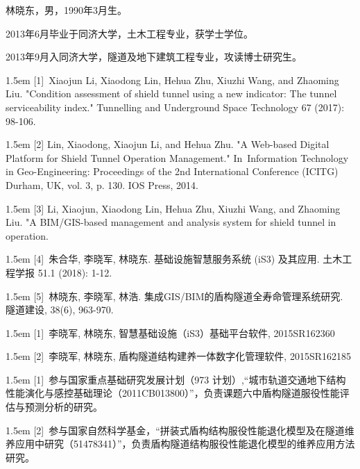 \begin{resume}

	林晓东，男，1990年3月生。

	2013年6月毕业于同济大学，土木工程专业，获学士学位。

	2013年9月入同济大学，隧道及地下建筑工程专业，攻读博士研究生。


	\hangindent 1.5em
	[1]~Xiaojun Li, Xiaodong Lin, Hehua Zhu, Xiuzhi Wang, and Zhaoming Liu. "Condition assessment of shield tunnel using a new indicator: The tunnel serviceability index." Tunnelling and Underground Space Technology 67 (2017): 98-106.

	\hangindent 1.5em
	[2] Lin, Xiaodong, Xiaojun Li, and Hehua Zhu. "A Web-based Digital Platform for Shield Tunnel Operation Management." In Information Technology in Geo-Engineering: Proceedings of the 2nd International Conference (ICITG) Durham, UK, vol. 3, p. 130. IOS Press, 2014.

	\hangindent 1.5em
	[3] Li, Xiaojun, Xiaodong Lin, Hehua Zhu, Xiuzhi Wang, and Zhaoming Liu. "A BIM/GIS-based management and analysis system for shield tunnel in operation.

	\hangindent 1.5em
	[4]~朱合华, 李晓军, 林晓东. 基础设施智慧服务系统 (iS3) 及其应用. 土木工程学报 51.1 (2018): 1-12.

	\hangindent 1.5em
	[5]~林晓东, 李晓军, 林浩. 集成GIS/BIM的盾构隧道全寿命管理系统研究. 隧道建设, 38(6), 963-970.
	





	\hangindent 1.5em
	[1]~李晓军, 林晓东, 智慧基础设施（iS3）基础平台软件, 2015SR162360

	\hangindent 1.5em
	[2]~李晓军, 林晓东, 盾构隧道结构建养一体数字化管理软件, 2015SR162185


	\hangindent 1.5em
	[1]~参与国家重点基础研究发展计划（973 计划）,“城市轨道交通地下结构性能演化与感控基础理论（2011CB013800）”，负责课题六中盾构隧道服役性能评估与预测分析的研究。

	\hangindent 1.5em
	[2]~参与国家自然科学基金，“拼装式盾构结构服役性能退化模型及在隧道维养应用中研究（51478341）”，负责盾构隧道结构服役性能退化模型的维养应用方法研究。

\end{resume}